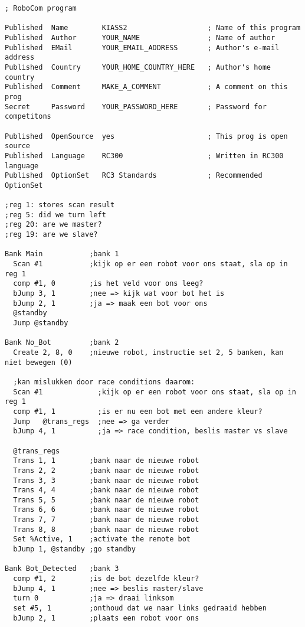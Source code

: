 \documentclass[10pt]{article}
\begin{document}
\begin{verbatim}; RoboCom program

Published  Name        KIASS2                   ; Name of this program
Published  Author      YOUR_NAME                ; Name of author
Published  EMail       YOUR_EMAIL_ADDRESS       ; Author's e-mail address
Published  Country     YOUR_HOME_COUNTRY_HERE   ; Author's home country
Published  Comment     MAKE_A_COMMENT           ; A comment on this prog
Secret     Password    YOUR_PASSWORD_HERE       ; Password for competitons

Published  OpenSource  yes                      ; This prog is open source
Published  Language    RC300                    ; Written in RC300 language
Published  OptionSet   RC3 Standards            ; Recommended OptionSet

;reg 1: stores scan result
;reg 5: did we turn left
;reg 20: are we master?
;reg 19: are we slave?

Bank Main           ;bank 1
  Scan #1           ;kijk op er een robot voor ons staat, sla op in reg 1
  comp #1, 0        ;is het veld voor ons leeg?
  bJump 3, 1        ;nee => kijk wat voor bot het is
  bJump 2, 1        ;ja => maak een bot voor ons
  @standby
  Jump @standby
  
Bank No_Bot         ;bank 2
  Create 2, 8, 0    ;nieuwe robot, instructie set 2, 5 banken, kan niet bewegen (0) 
  
  ;kan mislukken door race conditions daarom:
  Scan #1             ;kijk op er een robot voor ons staat, sla op in reg 1
  comp #1, 1          ;is er nu een bot met een andere kleur?  
  Jump   @trans_regs  ;nee => ga verder
  bJump 4, 1          ;ja => race condition, beslis master vs slave
  
  @trans_regs
  Trans 1, 1        ;bank naar de nieuwe robot
  Trans 2, 2        ;bank naar de nieuwe robot
  Trans 3, 3        ;bank naar de nieuwe robot
  Trans 4, 4        ;bank naar de nieuwe robot
  Trans 5, 5        ;bank naar de nieuwe robot
  Trans 6, 6        ;bank naar de nieuwe robot
  Trans 7, 7        ;bank naar de nieuwe robot
  Trans 8, 8        ;bank naar de nieuwe robot
  Set %Active, 1    ;activate the remote bot
  bJump 1, @standby ;go standby
  
Bank Bot_Detected   ;bank 3
  comp #1, 2        ;is de bot dezelfde kleur?
  bJump 4, 1        ;nee => beslis master/slave
  turn 0            ;ja => draai linksom
  set #5, 1         ;onthoud dat we naar links gedraaid hebben
  bJump 2, 1        ;plaats een robot voor ons
  

\end{verbatim}
\end{document}
